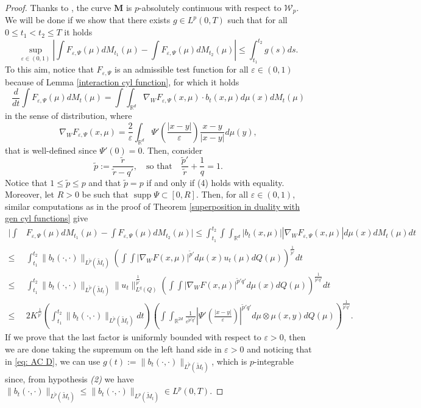 \documentclass[10pt,leqno]{amsart}
\numberwithin{equation}{section}
\newcommand{\R}{\mathbb{R}}
\newcommand{\Q}{\mathbb{Q}}
\renewcommand{\Q}{Q}
\begin{document}
\begin{proof}
	Thanks to \cite[Proposition 4.10]{pinzisavare2025}, the curve $\boldsymbol{M}$ is $p$-absolutely continuous with respect to $\mathcal{W}_p$. We will be done if we show that there exists $g\in L^p(0,T)$ such that for all $0\leq t_1 < t_2 \leq T$ it holds
	\begin{equation}\label{eq: AC D}
		\sup_{\varepsilon\in(0,1)} \left| \int F_{\varepsilon,\Psi}(\mu) dM_{t_1}(\mu) - \int F_{\varepsilon,\Psi}(\mu) dM_{t_2}(\mu) \right| \leq \int_{t_1}^{t_2} g(s) ds.
	\end{equation}
	To this aim, notice that $F_{\varepsilon,\Psi}$ is an admissible test function for all $\varepsilon\in(0,1)$ because of Lemma \ref{interaction cyl function}, for which it holds
	\[\frac{d}{dt} \int F_{\varepsilon,\Psi}(\mu) dM_t(\mu) = \int \int_{\R^d} \nabla_WF_{\varepsilon,\Psi}(x,\mu) \cdot b_t(x,\mu) d\mu(x)dM_t(\mu)\]
	in the sense of distribution, where 
	\[\nabla_WF_{\varepsilon,\Psi}(x,\mu) = \frac{2}{\varepsilon}\int_{\R^d} \Psi'\left(\frac{|x-y|}{\varepsilon}\right) \frac{x-y}{|x-y|} d\mu(y),\]
	that is well-defined since $\Psi'(0) = 0$. Then, consider
	\[ \tilde{p}:= \frac{\tilde{r}}{\tilde{r}-q'}, \quad \text{so that} \quad \frac{\tilde{p}'}{\tilde{r}} + \frac{1}{q} = 1.\]
	Notice that $1\leq \tilde{p} \leq p$ and that $\tilde{p} = p$ if and only if (4) holds with equality. Moreover, let $R>0$ be such that $\operatorname{supp}\Psi \subset [0,R]$. Then, for all $\varepsilon\in(0,1)$, similar computations as in the proof of Theorem \ref{superposition in duality with gen cyl functions} give    \begin{align*}
		\bigg| \int & F_{\varepsilon,\Psi}(\mu) dM_{t_1}(\mu) - \int F_{\varepsilon,\Psi}(\mu) dM_{t_2}(\mu) \bigg| \leq \int_{t_1}^{t_2} \int \int_{\R^d} |b_t(x,\mu)| |\nabla_W F_{\varepsilon,\Psi}(x,\mu)|d\mu(x)dM_{t}(\mu) dt
		\\
		\leq & \int_{t_1}^{t_2} \|b_t(\cdot,\cdot)\|_{L^{\tilde{p}}(\widetilde{M}_t)} \left( \int \int |\nabla_W F(x,\mu)|^{\tilde{p}'} d\mu(x) u_{t}(\mu)d\Q(\mu) \right)^{\frac{1}{\tilde{p}'}} dt
		\\
		\leq & \int_{t_1}^{t_2} \|b_t(\cdot,\cdot)\|_{L^{\tilde{p}}(\widetilde{M}_t)} \|u_t\|_{L^q(Q)}^{\frac{1}{\tilde{p}'}} \left( \int \int |\nabla_W F(x,\mu)|^{\tilde{p}'q'} d\mu(x) d\Q(\mu) \right)^{\frac{1}{\tilde{p}'q'}} dt
		\\
		\leq & 2 K^{\frac{1}{\tilde{p}'}} \left( \int_{t_1}^{t_2} \|b_t(\cdot,\cdot)\|_{L^{\tilde{p}}(\widetilde{M}_t)} dt \right)  \left( \int \int_{\R^{2d}} \frac{1}{\varepsilon^{\tilde{p}'q'}} \left| \Psi'\left(\frac{|x-y|}{\varepsilon}\right) \right|^{\tilde{p}'q'} d\mu\otimes \mu(x,y) d\Q(\mu) \right)^{\frac{1}{\tilde{p}'q'}}.
	\end{align*}
	If we prove that the last factor is uniformly bounded with respect to $\varepsilon>0$, then we are done taking the supremum on the left hand side in $\varepsilon>0$ and noticing that in \eqref{eq: AC D}, we can use $g(t):= \|b_t(\cdot,\cdot) \|_{L^{\tilde{p}}(\widetilde{M}_t)}$, which is $p$-integrable since, from hypothesis \textit{(2)} we have $\|b_t(\cdot,\cdot) \|_{L^{\tilde{p}}(\widetilde{M}_t)}\leq \|b_t(\cdot,\cdot)\|_{L^p(\widetilde{M}_t)} \in L^p(0,T)$.
	

\end{proof}
\end{document}
